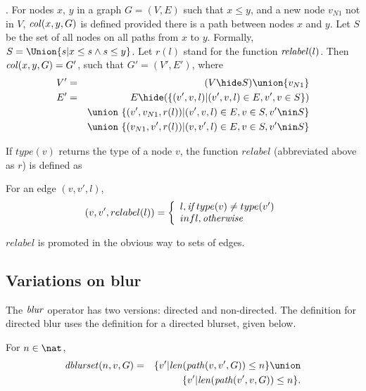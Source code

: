 \documentclass{elsarticle}
\begin{document}
\begin{definition}[$\col$]  \label{def:col}
.  For nodes $x$, $y$ in a graph $G = (V,E)$ such that $x \le y$, and a new node $v_{N1}$ not in $V$,  $\mathit{col}(x,y,G)$ is defined provided there is a path between nodes $x$ and $y$. Let $S$ be the set of all nodes on all paths from $x$ to $y$.
  Formally, $S=\Union \{s|x \le s \land s \le y\}$.
  Let $r(l)$ stand for the function $\mathit{relabel}(l)$. Then $\mathit{col}(x,y,G) =  G'$, such that $G'=(V',E')$, where 
  \begin{eqnarray*}
  V' & = & (V\hide S) \union \{v_{N1}\}     \\
  E' & = &  E\hide (
                   \{(v',v,l)| (v',v,l) \in E, v',v \in S\}
                  )\\
  && \union\ \{(v',v_{N1},r(l))|(v',v,l) \in E, v\in S, v'\nin S\}\\
                   && \union\ \{(v_{N1},v',r(l))|(v,v',l) \in E, v\in S, v' \nin S\}\\
  \end{eqnarray*}
\end{definition}
If $type(v)$ returns the type of a node $v$, the function $relabel$ (abbreviated above as $r$) is defined as 
\begin{definition}[$relabel$] \label{def:relabel}
  For an edge $(v,v',l)$, 
  \[
   (v,v',relabel(l)) = \left\{
   \begin{array}{l}
      l,    {\emph{if}}\; type(v) \neq type(v') \\
      infl, \emph{otherwise}
   \end{array}   \right.
  \]
\end{definition}
\noindent
$relabel$ is promoted in the obvious way to sets of edges.

\subsection{Variations on blur}


The $\mathit{blur}$ operator has two versions: directed and non-directed. The definition for directed blur uses the definition for a directed blurset, given below.

\begin{definition} \label{def:directed-blurset}
  For $n \in \nat$,
  \begin{eqnarray*}
    \dblurset(n,v,G) & = & \{v'|\len(\Path(v,v',G)) \leq n\}\union \\
                     &   & \{v'|\len(\Path(v',v,G)) \leq n\}.
  \end{eqnarray*}
\end{definition}
\end{document}
